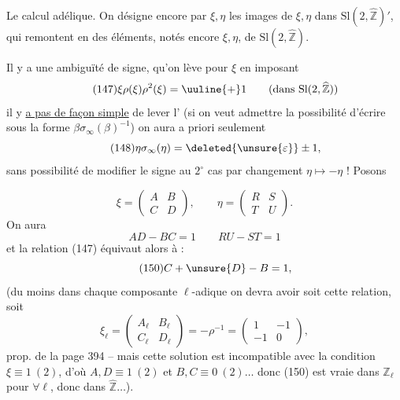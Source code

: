 
Le calcul adélique. On désigne encore par $\xi,\eta$ les images de $\xi,\eta$ dans $\mathrm{Sl}(2,\widehat{\mathbb Z})'$, qui remontent en des éléments, notés encore $\xi,\eta$, de $\mathrm{Sl}(2,\widehat{\mathbb Z})$.

Il y a une ambiguïté de signe, qu'on lève pour $\xi$ en imposant
\[
\tag{147}
\xi\rho(\xi)\rho^2(\xi)=\uuline{+}1
\qquad(\text{dans }\mathrm{Sl}(2,\widehat{\mathbb Z}))
\]
 il y \uline{a pas de façon simple} de lever l' (si on veut admettre  la possibilité d'écrire sous la forme $\beta\sigma_\infty(\beta)^{-1}$) \uline{} on aura a priori seulement
\[
\tag{148}
\eta\sigma_\infty(\eta)=\deleted{\unsure{\varepsilon}}\pm1,
\]
sans possibilité de modifier le signe au $2^\circ$ cas par changement $\eta\mapsto-\eta$ ! Posons


\[
\tag{148}
\xi=\begin{pmatrix}A&B\\C&D\end{pmatrix},\qquad
\eta=\begin{pmatrix}R&S\\T&U\end{pmatrix}.
\]
On aura
\[
\tag{149}
AD-BC=1\qquad RU-ST=1
\]
et la relation (147) équivaut alors à :
\[
\tag{150}
C+\unsure{D}-B=1,
\]
 (du moins dans chaque composante $\ell$-adique on devra avoir soit cette relation, soit
\[
\xi_\ell=\begin{pmatrix}A_\ell&B_\ell\\C_\ell&D_\ell\end{pmatrix}
=-\rho^{-1}=\begin{pmatrix}1&-1\\-1&0\end{pmatrix},
\]
 prop. de la page 394 -- mais cette solution est incompatible avec la condition $\boxed{\xi\equiv1\ (2)}$, d'où $A,D\equiv1\ (2)$ et $B,C\equiv0\ (2)\ldots$ donc (150) est vraie dans $\mathbb Z_\ell$ pour $\forall\ell$, donc dans $\widehat{\mathbb Z}\ldots$).


